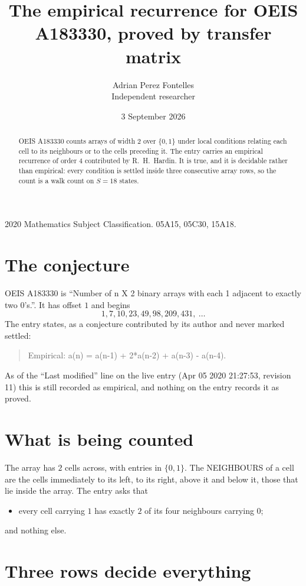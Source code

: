 \documentclass[11pt,a4paper]{article}
\title{The empirical recurrence for OEIS A183330, proved by transfer matrix}
\author{Adrian Perez Fontelles\\ \small Independent researcher}
\date{3 September 2026}
\theoremstyle{plain}
\theoremstyle{definition}
\begin{document}
\maketitle

\begin{abstract}
OEIS A183330 counts arrays of width $2$ over $\{0,1\}$ under local conditions relating each cell
to its neighbours or to the cells preceding it. The entry carries an empirical recurrence of
order $4$ contributed by R.~H.~Hardin. It is true, and it is decidable rather than
empirical: every condition is settled inside three consecutive array rows, so the count is a
walk count on $S=18$ states.
\end{abstract}

\noindent\small 2020 Mathematics Subject Classification. 05A15, 05C30, 15A18.\normalsize

\section{The conjecture}

OEIS A183330 is ``Number of n X 2 binary arrays with each 1 adjacent to exactly two 0's.''. It has offset $1$ and begins
\[
1, 7, 10, 23, 49, 98, 209, 431,\ \dots
\]
The entry states, as a conjecture contributed by its author and never marked settled:
\begin{quote}
Empirical: a(n) = a(n-1) + 2*a(n-2) + a(n-3) - a(n-4).
\end{quote}
As of the ``Last modified'' line on the live entry (Apr 05 2020 21:27:53, revision 11) this is still
recorded as empirical, and nothing on the entry records it as proved.

\section{What is being counted}

The array has $2$ cells across, with entries in $\{0,1\}$. The NEIGHBOURS of a cell are the
cells immediately to its left, to its right, above it and below it, those that lie inside the
array. The entry asks that
\begin{itemize}
\item every cell carrying $1$ has exactly $2$ of its four neighbours carrying $0$;
\end{itemize}
and nothing else.

\section{Three rows decide everything}
\end{document}
